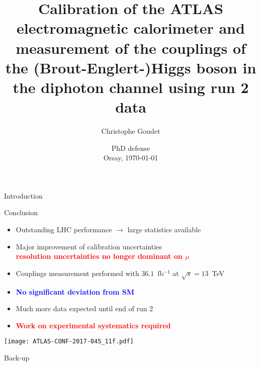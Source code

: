 \documentclass[a4paper]{beamer}
\title[Energy calibration \& Higgs couplings]{Calibration of the ATLAS electromagnetic calorimeter and measurement of the couplings of the (Brout-Englert-)Higgs boson in the diphoton channel using run 2 data}
\author[Christophe Goudet]{Christophe Goudet}
\institute[LAL]{\texttt{[image: LAL.jpg]} }
\date[Orsay, \today]{PhD defense \\ Orsay, \today}
\begin{document}
\transboxin
\begin{frame}
\maketitle
\end{frame}

\begin{frame}{Introduction}
\tableofcontents
\end{frame}





\begin{frame}{Conclusion}

  \begin{itemize}
  \item Outstanding LHC performance $\rightarrow$ large statistics available
  \item Major improvement of calibration uncertainties \\
    \textcolor{red}{\bf resolution uncertainties no longer dominant on $\mu$}
  \item Couplings measurement performed with $36.1$~fb$^{-1}$ at $\sqrt{s}=13$~TeV
  \item \textcolor{blue}{\bf No significant deviation from SM}
    \end{itemize}

  \begin{minipage}{0.39\linewidth}
    \begin{itemize}
    \item Much more data expected until end of run 2
    \item \textcolor{red}{\bf Work on experimental systematics required}
    \end{itemize}
  \end{minipage}
  \begin{minipage}{0.6\linewidth}
    \texttt{[image: ATLAS-CONF-2017-045\_11f.pdf]}
  \end{minipage}
\end{frame}

\appendix
\begin{frame}{Back-up}
\tableofcontents
\end{frame}





\end{document}
